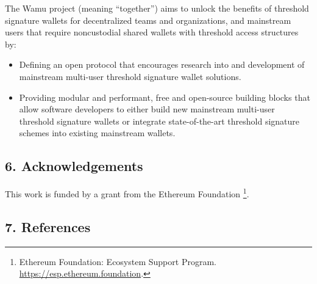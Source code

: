 \documentclass[
]{article}
\providecommand{\tightlist}{%
  \setlength{\itemsep}{0pt}\setlength{\parskip}{0pt}}
\begin{document}
The Wamu project (meaning ``together'') aims to unlock the benefits of
threshold signature wallets for decentralized teams and organizations,
and mainstream users that require noncustodial shared wallets with
threshold access structures by:

\begin{itemize}
\tightlist
\item
  Defining an open protocol that encourages research into and
  development of mainstream multi-user threshold signature wallet
  solutions.
\item
  Providing modular and performant, free and open-source building blocks
  that allow software developers to either build new mainstream
  multi-user threshold signature wallets or integrate state-of-the-art
  threshold signature schemes into existing mainstream wallets.
\end{itemize}

\hypertarget{acknowledgements}{%
\subsection{6. Acknowledgements}\label{acknowledgements}}

This work is funded by a grant from the Ethereum Foundation \footnote{Ethereum
  Foundation: Ecosystem Support Program.
  \url{https://esp.ethereum.foundation}.}.

\hypertarget{references}{%
\subsection{7. References}\label{references}}
\end{document}
